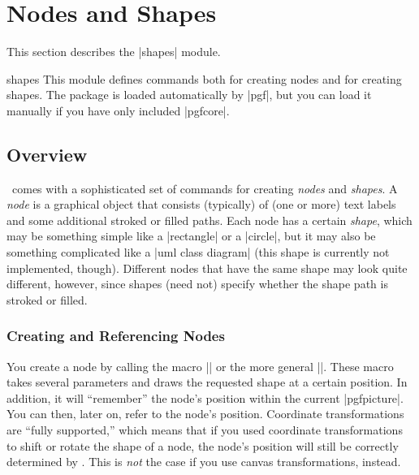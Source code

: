 %
%
%


\section{Nodes and Shapes}

\label{section-shapes}

This section describes the |shapes| module.

\begin{pgfmodule}{shapes}
  This module defines commands both for creating nodes and for
  creating shapes. The package is loaded automatically by |pgf|, but
  you can load it manually if you have  only included |pgfcore|.  
\end{pgfmodule}


\subsection{Overview}

\pgfname\ comes with a sophisticated set of commands for creating
\emph{nodes} and \emph{shapes}. A \emph{node} is a graphical object
that consists (typically) of (one or more) text labels and some
additional stroked or filled paths. Each node has a certain
\emph{shape}, which may be something simple like a |rectangle| or a
|circle|, but it may also be something complicated like a
|uml class diagram| (this shape is currently not implemented,
though). Different nodes that have the same shape may look quite
different, however, since shapes (need not) specify whether the shape
path is stroked or filled.


\subsubsection{Creating and Referencing Nodes}

You create a node by calling the macro |\pgfnode| or the more general
|\pgfmultipartnode|. These macro takes several parameters and draws
the requested shape at a certain position. In addition, it will
``remember'' the node's position within the current
|{pgfpicture}|. You can then, later on, refer to the 
node's position. Coordinate transformations are ``fully supported,''
which means that if you used coordinate transformations to shift or
rotate the shape of a node, the node's position will still be correctly
determined by \pgfname. This is \emph{not} the case if you use canvas
transformations, instead.


